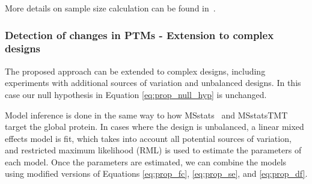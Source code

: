 \documentclass[mcp]{article}
\numberwithin{table}{section}
\begin{document}
More details on sample size calculation can be found in~\cite{oberg_vitek_09a}. 



\subsubsection*{Detection of changes in PTMs - Extension to complex designs}

The proposed approach can be extended to complex designs, including experiments with additional sources of variation and unbalanced designs. In this case our null hypothesis in Equation \ref{eq:prop_null_hyp} is unchanged.

Model inference is done in the same way to how MSstats~\cite{Choi:2014} and MSstatsTMT~\cite{Huang:2020} target the global protein. In cases where the design is unbalanced, a linear mixed effects model is fit, which takes into account all potential sources of variation, and restricted maximum likelihood (RML) is used to estimate the parameters of each model. Once the parameters are estimated, we can combine the models using modified versions of Equations \ref{eq:prop_fc}, \ref{eq:prop_se}, and \ref{eq:prop_df}.
\end{document}
